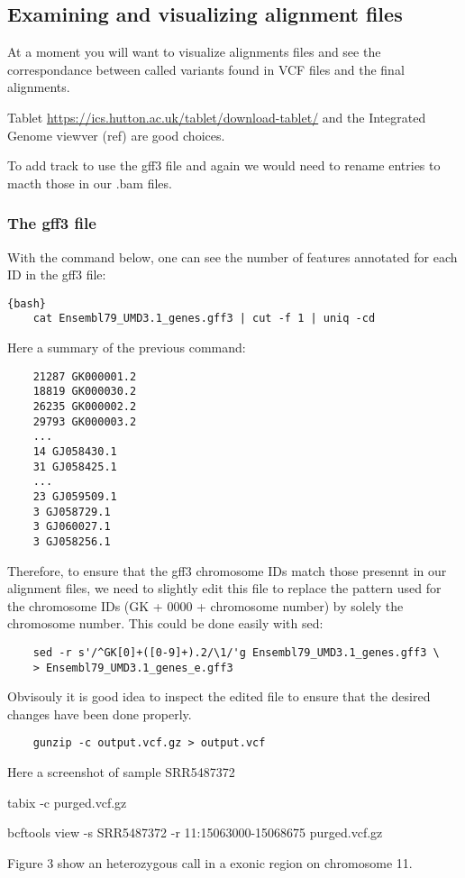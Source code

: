\subsection{Examining and visualizing alignment files}

At a moment you will want to visualize alignments files and see the correspondance between called variants found in VCF files and the final alignments.  

Tablet \href{https://ics.hutton.ac.uk/tablet/download-tablet/}{https://ics.hutton.ac.uk/tablet/download-tablet/} and the Integrated Genome viewver (ref) are good choices. 


To add track to use the gff3 file and again we would need to rename entries to macth those in our .bam files.



\subsubsection{The gff3 file}

With the command below, one can see the number of features annotated for each ID in the gff3 file: 

\begin{verbatim}{bash}
	cat Ensembl79_UMD3.1_genes.gff3 | cut -f 1 | uniq -cd
\end{verbatim}


Here a summary of the previous command:
\begin{verbatim}
	21287 GK000001.2
	18819 GK000030.2
	26235 GK000002.2
	29793 GK000003.2
	...
	14 GJ058430.1
	31 GJ058425.1
	...
	23 GJ059509.1
	3 GJ058729.1
	3 GJ060027.1
	3 GJ058256.1
\end{verbatim}

Therefore, to ensure that the gff3 chromosome IDs match those presennt in our alignment files, we need to slightly edit this file to replace the pattern used for the chromosome IDs (GK + 0000 + chromosome number) by solely the chromosome number. This could be done easily with sed:

\begin{verbatim}
	sed -r s'/^GK[0]+([0-9]+).2/\1/'g Ensembl79_UMD3.1_genes.gff3 \
	> Ensembl79_UMD3.1_genes_e.gff3
\end{verbatim}

Obvisouly it is good idea to inspect the edited file to ensure that the desired changes have been done properly.



\begin{verbatim}
	gunzip -c output.vcf.gz > output.vcf
\end{verbatim}


Here a screenshot of sample SRR5487372





tabix -c purged.vcf.gz

bcftools view -s SRR5487372 -r 11:15063000-15068675  purged.vcf.gz

Figure 3 show an heterozygous call in a exonic region on chromosome 11.







